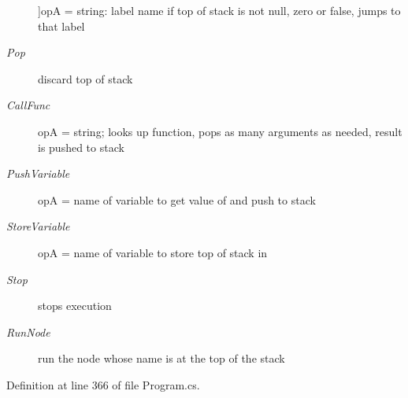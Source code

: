 \begin{Desc}
\begin{description}
{}]op\-A = string\-: label name if top of stack is not null, zero or false, jumps to that label \item[{\em 
\hypertarget{a00051_ad5dfb6ee68ca7469623ad3e459f98894a0ae61bd0474e04c9f1195d4baa0213a0}{Pop}\label{a00051_ad5dfb6ee68ca7469623ad3e459f98894a0ae61bd0474e04c9f1195d4baa0213a0}
}]discard top of stack \item[{\em 
\hypertarget{a00051_ad5dfb6ee68ca7469623ad3e459f98894a3b5e7e8300dc6e4b78cb865c5b10f01a}{Call\-Func}\label{a00051_ad5dfb6ee68ca7469623ad3e459f98894a3b5e7e8300dc6e4b78cb865c5b10f01a}
}]op\-A = string; looks up function, pops as many arguments as needed, result is pushed to stack \item[{\em 
\hypertarget{a00051_ad5dfb6ee68ca7469623ad3e459f98894ab8c46f65015a178516fadbb5ad6c2038}{Push\-Variable}\label{a00051_ad5dfb6ee68ca7469623ad3e459f98894ab8c46f65015a178516fadbb5ad6c2038}
}]op\-A = name of variable to get value of and push to stack \item[{\em 
\hypertarget{a00051_ad5dfb6ee68ca7469623ad3e459f98894a872dc050abaff4beb46e70dadd4088c2}{Store\-Variable}\label{a00051_ad5dfb6ee68ca7469623ad3e459f98894a872dc050abaff4beb46e70dadd4088c2}
}]op\-A = name of variable to store top of stack in \item[{\em 
\hypertarget{a00051_ad5dfb6ee68ca7469623ad3e459f98894a11a755d598c0c417f9a36758c3da7481}{Stop}\label{a00051_ad5dfb6ee68ca7469623ad3e459f98894a11a755d598c0c417f9a36758c3da7481}
}]stops execution \item[{\em 
\hypertarget{a00051_ad5dfb6ee68ca7469623ad3e459f98894ae956bcf888278c168ee9b106927ff6ac}{Run\-Node}\label{a00051_ad5dfb6ee68ca7469623ad3e459f98894ae956bcf888278c168ee9b106927ff6ac}
}]run the node whose name is at the top of the stack \end{description}
\end{Desc}


Definition at line 366 of file Program.\-cs.


